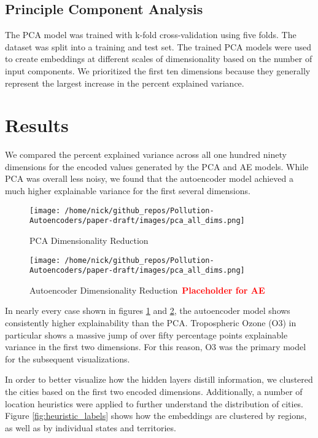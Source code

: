 \documentclass{article}
\newcommand\note[1]{\textbf{\textcolor{red}{#1}}}
\begin{document}
\subsection{Principle Component Analysis}
The PCA model was trained with k-fold cross-validation using five folds. The dataset was split into a training and test set. The trained PCA models were used to create embeddings at different scales of dimensionality based on the number of input components. We prioritized the first ten dimensions because they generally represent the largest increase in the percent explained variance.

\section{Results}

\par We compared the percent explained variance across all one hundred ninety dimensions for the encoded values generated by the PCA and AE models. While PCA was overall less noisy, we found that the autoencoder model achieved a much higher explainable variance for the first several dimensions.

\begin{center}
\begin{figure}[h!]
    \centering
    \texttt{[image: /home/nick/github\_repos/Pollution-Autoencoders/paper-draft/images/pca\_all\_dims.png]} 
    \caption{PCA Dimensionality Reduction}
    \label{fig:pca_dim_reduction}
\end{figure}

\begin{figure}[h!]
    \centering
    \texttt{[image: /home/nick/github\_repos/Pollution-Autoencoders/paper-draft/images/pca\_all\_dims.png]} 
    \caption{Autoencoder Dimensionality Reduction\ \note{Placeholder for AE}}
    \label{fig:ae_dim_reduction}
\end{figure}
\end{center}

\par In nearly every case shown in figures \ref{fig:pca_dim_reduction} and \ref{fig:ae_dim_reduction}, the autoencoder model shows consistently higher explainability than the PCA. Tropospheric Ozone (O3) in particular shows a massive jump of over fifty percentage points explainable variance in the first two dimensions. For this reason, O3 was the primary model for the subsequent visualizations.
\par In order to better visualize how the hidden layers distill information, we clustered the cities based on the first two encoded dimensions. Additionally, a number of location heuristics were applied to further understand the distribution of cities. Figure \ref{fig:heuristic_labels} shows how the embeddings are clustered by regions, as well as by individual states and territories.
\end{document}
